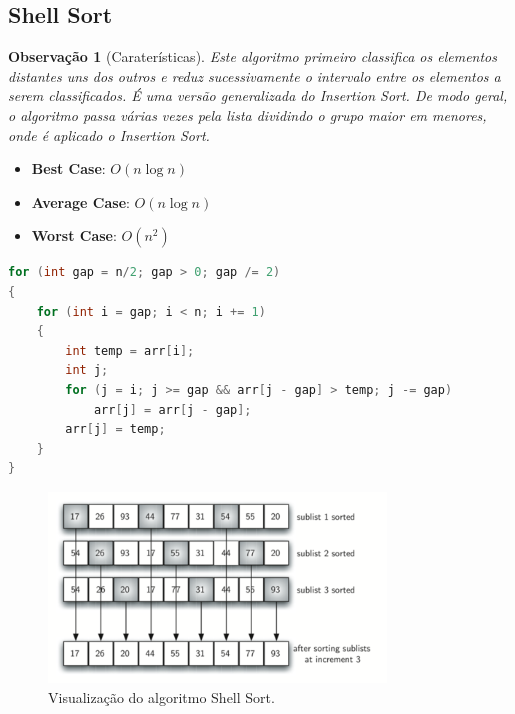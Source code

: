 \documentclass[a4paper, 12pt]{article}
\newtheorem{remark}{Observação}
\begin{document}
\subsection{Shell Sort}
\begin{remark}[Caraterísticas]
    Este algoritmo primeiro classifica os elementos distantes uns dos outros e reduz sucessivamente o intervalo entre os elementos a serem classificados. É uma versão generalizada do Insertion Sort. De modo geral, o algoritmo passa várias vezes pela lista dividindo o grupo maior em menores, onde é aplicado o Insertion Sort.\end{remark}
    \begin{itemize}
        \item \textbf{Best Case}: $O(n\log n)$
        \item \textbf{Average Case}: $O(n\log n)$
        \item \textbf{Worst Case}: $O(n^2)$
    \end{itemize}


\begin{center}
    \begin{lstlisting}[frame=single, language=c, caption=Algoritmo Shell Sort, captionpos=b]
for (int gap = n/2; gap > 0; gap /= 2)
{
    for (int i = gap; i < n; i += 1)
    {
        int temp = arr[i];
        int j;            
        for (j = i; j >= gap && arr[j - gap] > temp; j -= gap)
            arr[j] = arr[j - gap];
        arr[j] = temp;
    }
}
    \end{lstlisting}
    
    \begin{figure}[h]
        \centering
        \includegraphics[width=0.8\textwidth]{fig/ao/shs.png}
        \caption{Visualização do algoritmo Shell Sort.}
    \end{figure}
\end{center}
\end{document}
